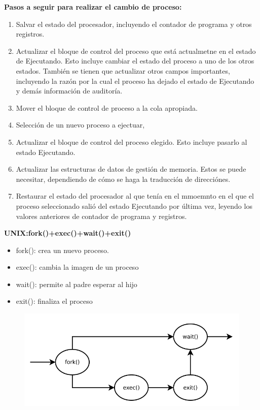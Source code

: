 \documentclass{article}
\begin{document}
\textbf{Pasos a seguir para realizar el cambio de proceso:}
\begin{enumerate}
\item Salvar el estado del procesador, incluyendo el contador de programa y otros registros.

\item Actualizar el bloque de control del proceso que está actualmetne en el estado de Ejecutando. Esto incluye cambiar el estado del proceso a uno de los otros estados. También se tienen que actualizar otros campos importantes, incluyendo la razón por la cual el proceso ha dejado el estado de Ejecutando y demás información de auditoría.

\item Mover el bloque de control de proceso a la cola apropiada.

\item Selección de un nuevo proceso a ejectuar,

\item Actualizar el bloque de control del proceso elegido. Esto incluye pasarlo al estado Ejecutando.

\item Actualizar las estructuras de datos de gestión de memoria. Estos se puede necesitar, dependiendo de cómo se haga la traducción de direcciónes.

\item Restaurar el estado del procesador al que tenía en el mmoemnto en el que el proceso seleccionado salió del estado Ejecutando por última vez, leyendo los valores anteriores de contador de programa y registros.
\end{enumerate}

\textbf{UNIX:fork()+exec()+wait()+exit()}
\begin{itemize}
\item fork(): crea un nuevo proceso.

\item exec(): cambia la imagen de un proceso

\item wait(): permite al padre esperar al hijo

\item exit(): finaliza el proceso
\end{itemize}

\begin{figure}[h]
\centering
\includegraphics[scale=1,width=\textwidth]{fork.png}
\end{figure}
\end{document}
